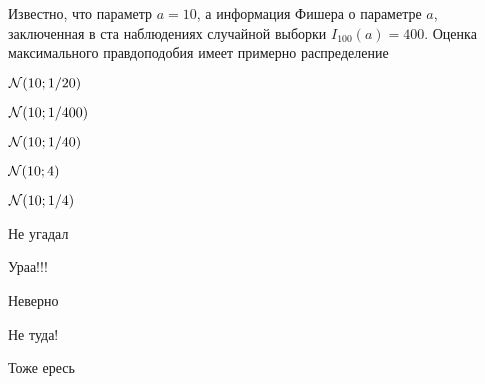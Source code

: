 
\begin{question}
Известно, что параметр \(a = 10\), а информация Фишера о параметре
\(a\), заключенная в ста наблюдениях случайной выборки
\(I_{100}(a)=400\). Оценка максимального правдоподобия имеет примерно
распределение
\begin{answerlist}
  \item \(\mathcal{N}(10; 1/20)\)
  \item \(\mathcal{N}(10; 1/400)\)
  \item \(\mathcal{N}(10; 1/40)\)
  \item \(\mathcal{N}(10; 4)\)
  \item \(\mathcal{N}(10; 1/4)\)
\end{answerlist}
\end{question}

\begin{solution}
\begin{answerlist}
  \item Не угадал
  \item Ураа!!!
  \item Неверно
  \item Не туда!
  \item Тоже ересь
\end{answerlist}
\end{solution}

